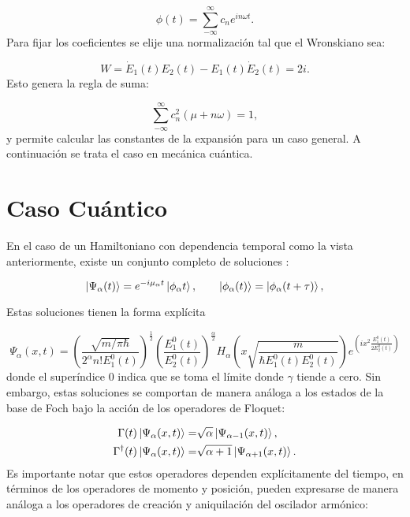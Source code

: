 \documentclass[a4paper,10pt]{report}
\begin{document}
\begin{equation}
\phi(t) = \sum_{-\infty}^\infty c_n e^{in\omega t}.
\end{equation} Para fijar los coeficientes se elije una normalización tal que el Wronskiano sea:

\begin{equation}
W = \dot{E}_1(t)E_2(t)-E_1(t)\dot{E}_2(t) = 2i.
\end{equation}Esto genera la regla de suma:

\begin{equation}
\sum_{-\infty}^\infty c_n^2(\mu + n\omega) = 1,
\end{equation} y permite calcular las constantes de la expansión para un caso general. A continuación se trata el caso en mecánica cuántica.

\section{Caso Cuántico}

En el caso de un Hamiltoniano con dependencia temporal como la vista anteriormente, existe un conjunto completo de soluciones \cite{BarnettSD}:

\begin{equation}
\Ket{\Psi_\alpha (t)} = e^{-i\mu_\alpha t}\Ket{\phi_\alpha t}, \qquad \Ket{\phi_\alpha (t)}=\Ket{\phi_\alpha (t+\tau)},
\end{equation}

Estas soluciones tienen la forma explícita\cite{BrownPT}

\begin{equation}
\Psi_\alpha (x,t) = (\frac{\sqrt{m/\pi\hbar}}{2^\alpha n!E_1^0(t)})^{\frac{1}{2}}(\frac{E_1^0(t)}{E_2^0(t)})^\frac{\alpha}{2}H_\alpha(x\sqrt{\frac{m}{\hbar E_1^0(t) E_2^0(t)}})e^{(ix^2\frac{E_1^0(t)}{2E_2^0(t)})}
\end{equation} donde el superíndice 0 indica que se toma el límite donde $\gamma$ tiende a cero. Sin embargo, estas soluciones se comportan de manera análoga a los estados de la base de Foch bajo la acción de los operadores de Floquet:

\begin{align*}\label{FloquetOperators}
\Gamma(t) \Ket{\Psi_\alpha (x,t)} =& \sqrt{\alpha}\Ket{\Psi_{\alpha-1} (x,t)}, \\
\Gamma^\dagger(t) \Ket{\Psi_\alpha (x,t)} =& \sqrt{\alpha+1}\Ket{\Psi_{\alpha+1} (x,t)}.
\end{align*}Es importante notar que estos operadores dependen explícitamente del tiempo, en términos de los operadores de momento y posición, pueden expresarse de manera análoga a los operadores de creación y aniquilación del oscilador armónico:
\end{document}
